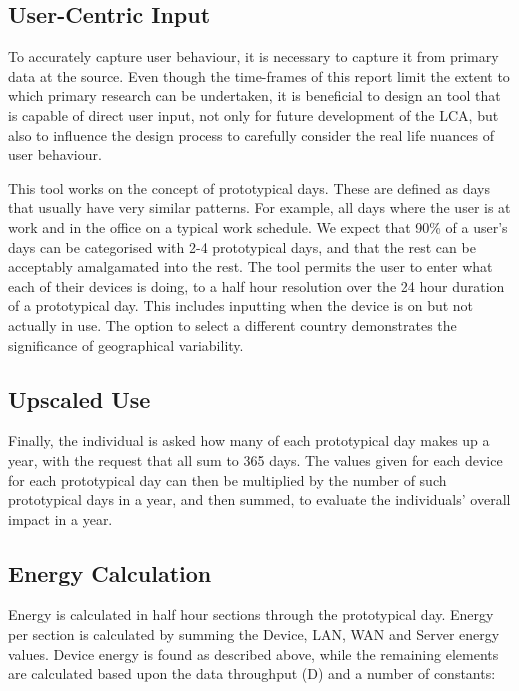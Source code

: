\documentclass[conference]{IEEEtran}
\begin{document}
\subsection{User-Centric Input}

To accurately capture user behaviour, it is necessary to capture it
from primary data at the source. Even though the time-frames of this
report limit the extent to which primary research can be undertaken,
it is beneficial to design an tool that is capable of direct user
input, not only for future development of the LCA, but also to
influence the design process to carefully consider the real life
nuances of user behaviour.

This tool works on the concept of prototypical days. These are defined
as days that usually have very similar patterns. For example, all days
where the user is at work and in the office on a typical work
schedule. We expect that 90\% of a user’s days can be categorised with
2-4 prototypical days, and that the rest can be acceptably amalgamated
into the rest. The tool permits the user to enter what each of their
devices is doing, to a half hour resolution over the 24 hour duration
of a prototypical day. This includes inputting when the device is on
but not actually in use.  The option to select a different country
demonstrates the significance of geographical variability.

\subsection{Upscaled Use}

Finally, the individual is asked how many of each prototypical day
makes up a year, with the request that all sum to 365 days. The values
given for each device for each prototypical day can then be multiplied
by the number of such prototypical days in a year, and then summed, to
evaluate the individuals' overall impact in a year.

\subsection{Energy Calculation}

Energy is calculated in half hour sections through the prototypical
day. Energy per section is calculated by summing the Device, LAN, WAN
and Server energy values. Device energy is found as described above,
while the remaining elements are calculated based upon the data
throughput (D) and a number of constants:
\end{document}

